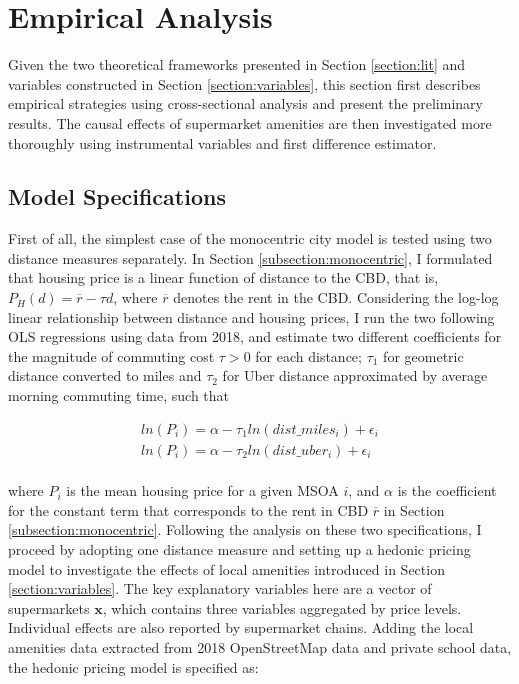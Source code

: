 \documentclass{article}
\begin{document}
\section{Empirical Analysis} \label{section:model}
Given the two theoretical frameworks presented in Section \ref{section:lit} and variables constructed in Section \ref{section:variables}, this section first describes empirical strategies using cross-sectional analysis and present the preliminary results. The causal effects of supermarket amenities are then investigated more thoroughly using instrumental variables and first difference estimator.
\subsection{Model Specifications} \label{subsection:specifications}
First of all, the simplest case of the monocentric city model is tested using two distance measures separately. In Section \ref{subsection:monocentric}, I formulated that housing price is a linear function of distance to the CBD, that is, $P_H(d) = \overline{r} - \tau d$, where $\overline{r}$ denotes the rent in the CBD. Considering the log-log linear relationship between distance and housing prices, I run the two following OLS regressions using data from 2018, and estimate two different coefficients for the magnitude of commuting cost $\tau > 0$ for each distance; $\tau_1$ for geometric distance converted to miles and $\tau_2$ for Uber distance approximated by average morning commuting time, such that

\begin{gather*}
ln(P_i) = \alpha - \tau_1 ln(dist\_miles_i) + \epsilon_i \\
ln(P_i) = \alpha - \tau_2 ln(dist\_uber_i) + \epsilon_i
\end{gather*}
\\
where $P_i$ is the mean housing price for a given MSOA $i$, and $\alpha$ is the coefficient for the constant term that corresponds to the rent in CBD $\overline{r}$ in Section \ref{subsection:monocentric}. Following the analysis on these two specifications, I proceed by adopting one distance measure and setting up a hedonic pricing model to investigate the effects of local amenities introduced in Section \ref{section:variables}. The key explanatory variables here are a vector of supermarkets $\boldsymbol{x}$, which contains three variables aggregated by price levels. Individual effects are also reported by supermarket chains. Adding the local amenities data extracted from 2018 OpenStreetMap data and private school data, the hedonic pricing model is specified as:
\end{document}
